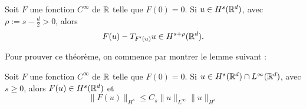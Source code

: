 \documentclass[11pt,a4paper]{article}
\begin{document}
\begin{thm}\label{paralin}
Soit $F$ une fonction $C^{\infty}$ de $\mathbb R$ telle que $F(0)=0$. Si $u\in H^s(\mathbb R^d)$, avec $\rho := s - \frac{d}{2}>0 $, alors 
\begin{equation}
F(u) - T_{F'(u)}u \in H^{s+\rho}(\mathbb R^d).
\end{equation}
\end{thm}
Pour prouver ce théorème, on commence par montrer le lemme suivant : 

\begin{lemma}\label{lem_paralin}
Soit $F$ une fonction $C^{\infty}$ de $\mathbb R$ telle que $F(0)=0$. Si $u\in H^s(\mathbb R^d)\cap L^{\infty}(\mathbb R^d) $, avec $s\geq 0 $, alors $F(u) \in H^s(\mathbb R^d)$ et 
\begin{equation}
\|F(u)\|_{H^s} \leq C_s \|u\|_{L^{\infty}} \|u\|_{H^s}
\end{equation}
\end{lemma}
\end{document}
